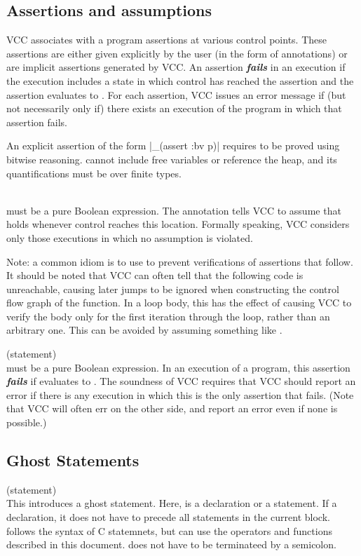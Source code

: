 \documentclass[preprint,nocopyrightspace]{sigplanconf}
\newcommand{\Def}[1]{\textit{\textbf{#1}}}
\begin{document}
{{{\begin{VCC}
\subsection{Assertions and assumptions}
VCC associates with a program assertions at various control
points. These assertions are either given explicitly by the user (in
the form of  annotations) or are implicit assertions
generated by VCC. An assertion \Def{fails} in an execution if the
execution includes a state in which control has reached the assertion
and the assertion evaluates to . For each assertion, VCC issues an
error message if (but not necessarily only if) there exists an
execution of the program in which that assertion fails.

An explicit assertion of the form \vcc|_(assert {:bv} p)|
requires  to be proved using bitwise reasoning. 
cannot include free variables or reference the heap, and its
quantifications must be over finite types.

\\
 must be a pure Boolean
expression. The annotation tells VCC to assume that  holds
whenever control reaches this location. Formally speaking, VCC
considers only those executions in which no assumption is violated.

Note: a common idiom is to use  to prevent
verifications of assertions that follow. It should be noted that VCC
can often tell that the following code is unreachable, causing later
jumps to be ignored when constructing the control flow graph of the
function. In a loop body, this has the effect of causing VCC to verify
the body only for the first iteration through the loop, rather than an
arbitrary one. This can be avoided by assuming something like 
.

 (statement)\\
 must be a pure Boolean
expression. In an execution of a program, this assertion \Def{fails}
if  evaluates to . The soundness of VCC requires that
VCC should report an error if there is any execution in which this is
the only assertion that fails. (Note that VCC will often err on the
other side, and report an error even if none is possible.)

\subsection{Ghost Statements}
 (statement)\\
This introduces a ghost statement.
Here,  is a declaration or a statement. If a declaration,
it does not have to precede all statements in the current block.
 follows the syntax of C statemnets, but can use the
operators and functions described in this document.  does
not have to be terminateed by a semicolon.


\end{VCC}}}}
\end{document}
